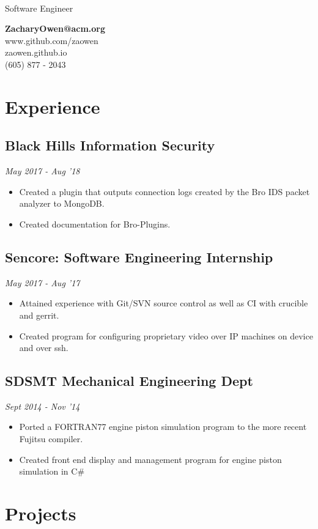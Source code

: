 \documentclass[11pt]{article}
\author{Zachary Owen}
\makeatletter
\renewcommand{\maketitle}{
\begin{multicols}{2}
\begin{flushleft}
   {\huge \bfseries
   \theauthor\\}
   {\color{red} Software Engineer}
\end{flushleft}

\columnbreak

\begin{flushright}
{\bfseries ZacharyOwen@acm.org} \\
www.github.com/zaowen \\
zaowen.github.io \\
(605) 877 - 2043 \\
\end{flushright}
\end{multicols}
}
\makeatother
\begin{document}
\maketitle

\section{E{\color{gray}xperience}}

\subsection{Black Hills Information Security \hfill}
{\it May 2017 - Aug '18}
\begin{itemize}
\setlength\itemsep{-.5em}
\item Created a plugin that outputs connection logs created by the Bro IDS packet analyzer to MongoDB. 
\item Created documentation for Bro-Plugins.
\end{itemize}

\subsection{Sencore: Software Engineering Internship \hfill}
{\it May 2017 - Aug '17}
\begin{itemize}
\setlength\itemsep{-.5em}
\item Attained experience with Git/SVN source control as well as CI with crucible and gerrit.
\item Created program for configuring proprietary video over IP machines on device and over ssh.
\end{itemize}

\subsection{SDSMT Mechanical Engineering Dept \hfill}
{\it Sept 2014 - Nov '14}
\begin{itemize}
\setlength\itemsep{-.5em}
\item Ported a FORTRAN77 engine piston simulation program to the more recent Fujitsu compiler. 
\item Created front end display and management program for engine piston simulation in C\#
\end{itemize}

\section{P{\color{gray}rojects}}
\end{document}

